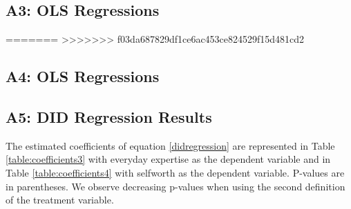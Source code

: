 \documentclass[12pt, a4paper, titlepage]{article}\usepackage[]{graphicx}\usepackage[]{color}
\begin{document}
\subsection{A3: OLS Regressions}
=======
>>>>>>> f03da687829df1ce6ac453ce824529f15d481cd2

\subsection{A4: OLS Regressions}



% 

\subsection{A5: DID Regression Results}

The estimated coefficients of equation \ref{didregression} are represented in Table \ref{table:coefficients3} with everyday expertise as the dependent variable and in Table \ref{table:coefficients4} with selfworth as the dependent variable. P-values are in parentheses. We observe decreasing p-values when using the second definition of the treatment variable.
\end{document}
